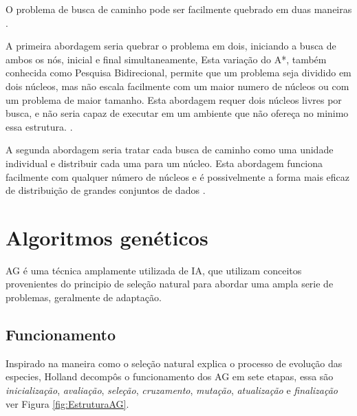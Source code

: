 O problema de busca de caminho pode ser facilmente quebrado em duas maneiras \cite{WilliamMiller}.

A primeira abordagem seria quebrar o problema em dois, iniciando a busca  de ambos os nós, inicial e final simultaneamente, Esta variação do A*, também conhecida como Pesquisa Bidirecional, permite que um problema seja dividido em dois núcleos, mas não escala facilmente com um maior numero de núcleos ou com um problema de maior tamanho. Esta abordagem requer dois núcleos livres por busca, e não seria capaz de executar em um ambiente que não ofereça no minimo essa estrutura. \cite{Janie_Chang}.

A segunda abordagem seria tratar cada busca de caminho como uma unidade individual e distribuir cada uma para um núcleo.
Esta abordagem funciona facilmente com qualquer número de núcleos e é possivelmente a forma mais eficaz de distribuição de grandes conjuntos de dados \cite{Jad} \cite{WilliamMiller}.


\section{Algoritmos genéticos}

AG é uma técnica amplamente utilizada de IA, que utilizam conceitos provenientes do principio de seleção natural para abordar uma  ampla serie de problemas, geralmente de adaptação.

\subsection{Funcionamento}
 
Inspirado na maneira como o seleção natural explica o processo de evolução das especies, Holland \cite{Holland1975} decompôs o funcionamento dos AG em sete etapas, essa são \textit{inicialização}, \textit{avaliação}, \textit{seleção}, \textit{cruzamento}, \textit{mutação}, \textit{atualização} e  \textit{finalização} ver Figura \ref{fig:EstruturaAG}. \cite{DiogoCLucas}

